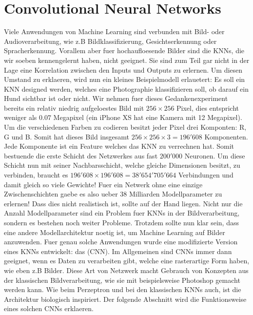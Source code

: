 \chapter{Convolutional Neural Networks}
Viele Anwendungen von Machine Learning sind verbunden mit Bild- oder
Audioverarbeitung, wie z.B Bildklassifizierung, Gesichtserkennung oder
Spracherkennung.
Vorallem aber fuer hochaufloesende Bilder sind die KNNs, die wir soeben
kennengelernt haben, nicht geeignet. Sie sind zum Teil gar nicht in der
Lage eine Korrelation zwischen den Inputs und Outputs zu erlernen.
Um diesen Umstand zu erklaeren, wird nun ein kleines Beispielmodell erlauetert:
\para{}
\label{sec:CNN_parameter_problem}
Es soll ein KNN designed werden, welches eine Photographie klassifizieren
soll, ob darauf ein Hund sichtbar ist oder nicht. Wir nehmen fuer dieses
Gedankenexperiment bereits ein relativ niedrig aufgeloestes Bild mit $256 \times 256$
Pixel, dies entspricht weniger als $0.07$ Megapixel (ein iPhone XS hat eine Kamera mit
12 Megapixel). Um die verschiedenen Farben zu codieren besitzt jeder Pixel drei Komponten: R, G
und B. Somit hat dieses Bild insgesamt $256 \times 256 \times 3 = 196'608$
Komponenten. Jede Komponente ist ein Feature welches das KNN zu verrechnen hat. Somit bestuende
die erste Schicht des Netzwerkes aus fast $200'000$ Neuronen. Um diese Schicht
nun mit seiner Nachbarsschicht, welche gleiche Dimensionen besitzt, zu verbinden, braucht
es $196'608 \times 196'608 = 38'654'705'664$ Verbindungen und damit gleich so
viele Gewichte! Fuer ein Netwerk ohne eine einzige Zwischenschichten gaebe es
also ueber 38 Milliarden Modellparameter zu erlernen! Dass dies nicht realistisch ist,
sollte auf der Hand liegen.
\para{}
Nicht nur die Anzahl Modellparameter sind ein Problem fuer KNNs in der
Bildverarbeitung, sondern es bestehen noch weiter Probleme.
Trotzdem sollte nun klar sein, dass eine andere Modellarchitektur noetig ist, um Machine
Learning auf Bilder anzuwenden. Fuer genau solche Anwendungen wurde eine modifizierte
Version eines KNNs entwickelt: das  (CNN).
Im Allgemeinen sind CNNs immer dann geeignet, wenn es Daten zu verarbeiten gibt, welche eine
rasterartige Form haben, wie eben z.B Bilder.
Diese Art von Netzwerk macht Gebrauch von Konzepten aus der klassischen
Bildverarbeitung, wie sie mit beispielsweise Photoshop gemacht werden kann.
Wie beim Perzeptron und bei den klassischen KNNs auch, ist die Architektur
biologisch inspiriert.
Der folgende Abschnitt wird die Funktionsweise eines solchen CNNs erklaeren.
\para{}
\cite{Goodfellow-et-al-2016}
\cite{deeplearning.ai:cnn}
\cite{wiki:cnn}


